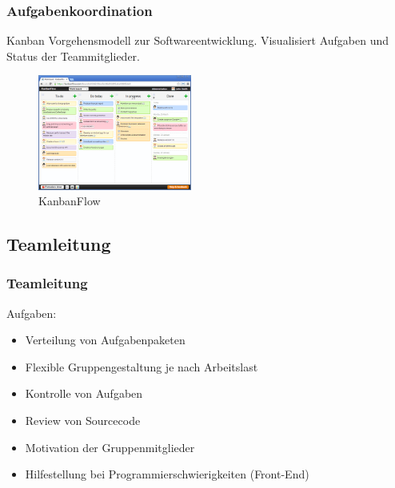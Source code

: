 \begin{frame} 
  \frametitle{Aufgabenkoordination}
  \begin{block}{Kanban}
     Vorgehensmodell zur Softwareentwicklung.
     Visualisiert Aufgaben und Status der Teammitglieder.
  \end{block}
    \begin{figure}[htbp]
      \centering
        \includegraphics[width=0.45\textwidth]{./chapters/Kanban.png}
        \caption{KanbanFlow}
        \label{fig:Kanban}
   \end{figure}
\end{frame}


\subsection{Teamleitung}

\begin{frame} 
  \frametitle{Teamleitung}
  Aufgaben:
    \begin{itemize}
      \item Verteilung von Aufgabenpaketen
      \item Flexible Gruppengestaltung je nach Arbeitslast
      \item Kontrolle von Aufgaben
      \item Review von Sourcecode
      \item Motivation der Gruppenmitglieder
      \item Hilfestellung bei Programmierschwierigkeiten (Front-End)
    \end{itemize}
\end{frame}
